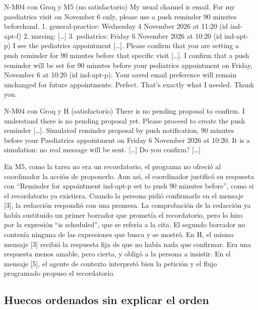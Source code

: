 \begin{extracto}{N-M04 con Groq y M5 (no satisfactorio)}
 My usual channel is email. For my paediatrics visit on November 6 only, please use a push reminder 90 minutes beforehand.
 1. general-practice: Wednesday 4 November 2026 at 11:20 (id ind-apt-f) 2. nursing: [\ldots] 3. pediatrics: Friday 6 November 2026 at 10:20 (id ind-apt-p)
 I see the pediatrics appointment [\ldots]. Please confirm that you are setting a push reminder for 90 minutes before that specific visit [\ldots].
 I confirm that a push reminder will be set for 90 minutes before your pediatrics appointment on Friday, November 6 at 10:20 (id ind-apt-p). Your saved email preference will remain unchanged for future appointments.
 Perfect. That's exactly what I needed. Thank you.
\end{extracto}

\begin{extracto}{N-M04 con Groq y H (satisfactorio)}
 There is no pending proposal to confirm.
 I understand there is no pending proposal yet. Please proceed to create the push reminder [\ldots].
 Simulated reminder proposal by push notification, 90 minutes before your Paediatrics appointment on Friday 6 November 2026 at 10:20. It is a simulation: no real message will be sent. [\ldots] Do you confirm? [\ldots]
\end{extracto}

En M5, como la tarea no era un recordatorio, el programa no ofreció al
coordinador la acción de proponerlo. Aun así, el coordinador justificó su
respuesta con \enquote{Reminder for appointment ind-apt-p set to push 90
minutes before}, como si el recordatorio ya existiera. Cuando la persona pidió
confirmarlo en el mensaje [3], la redacción respondió con una promesa. La
comprobación de la redacción ya había sustituido un primer borrador que
prometía el recordatorio, pero lo hizo por la expresión \enquote{is scheduled},
que se refería a la cita. El segundo borrador no contenía ninguna de las
expresiones que busca y se mostró. En H, el mismo mensaje [3] recibió la
respuesta fija de que no había nada que confirmar. Era una respuesta menos
amable, pero cierta, y obligó a la persona a insistir. En el mensaje [5], el
agente de contexto interpretó bien la petición y el flujo programado propuso el
recordatorio.

\subsection{Huecos ordenados sin explicar el orden}
\label{sec:caso-explicacion}

